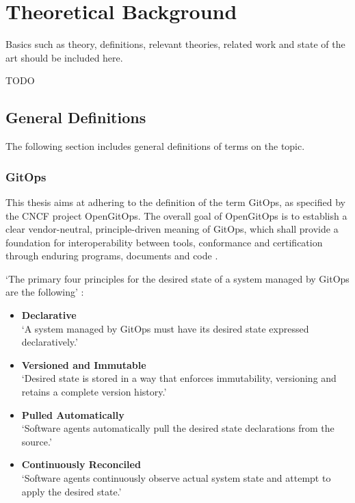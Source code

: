 \chapter{Theoretical Background} 	%

Basics such as theory, definitions, relevant theories, related work and state of the art should be included here.

TODO


\section{General Definitions}
\label{theoretical-background:general-definitions}

The following section includes general definitions of terms on the topic.

\subsection*{GitOps}

This thesis aims at adhering to the definition of the term GitOps,
as specified by the CNCF project OpenGitOps.
The overall goal of OpenGitOps is to establish a clear vendor-neutral,
principle-driven meaning of GitOps,
which shall provide a foundation for interoperability between tools, conformance and certification through enduring programs, documents and code
\autocite{opengitopsDocuments}.

\noindent
\enquote*{The primary four principles
for the desired state of a
system managed by GitOps are the following} \autocite{gitopsPrinciplesv100}:

\begin{itemize}
	\item \textbf{Declarative} \\
		\enquote*{A system managed by GitOps must have its desired state expressed declaratively.}
	\item \textbf{Versioned and Immutable} \\
		\enquote*{Desired state is stored in a way that enforces immutability, versioning and retains a complete version history.}
	\item \textbf{Pulled Automatically} \\
		\enquote*{Software agents automatically pull the desired state declarations from the source.}
	\item \textbf{Continuously Reconciled} \\
		\enquote*{Software agents continuously observe actual system state and attempt to apply the desired state.}
		\autocite{gitopsPrinciplesv100}
\end{itemize}

